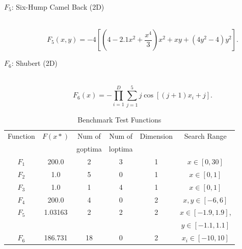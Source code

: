\documentclass[a4j,11pt]{jarticle}
\def\proposed{DNRBA}
\begin{document}
\begin{description}
\item[$F_5$: Six-Hump Camel Back (2D)]\mbox{}\\
\begin{equation}
\label{eq:F5}
F_5(x,y)=-4[(4-2.1x^2+\frac{x^4}{3})x^2+xy+(4y^2-4)y^2].
\end{equation}

\item[$F_6$: Shubert (2D)]\mbox{}\\
\begin{equation}
\label{eq:F6}
F_6(x)=-\prod_{i=1}^D \sum_{j=1}^5 j\cos[(j+1)x_i+j].
\end{equation}

\end{description}

\begin{table}[h]
\caption{Benchmark Test Functions}
\begin{center}
\begin{tabular}{c|c|c|c|c|c}
\hline

Function & $F(x*)$ & Num of & Num of & Dimension & Search Range \\
& & goptima & loptima & & \\
\hline
$F_1$ & 200.0 & 2 & 3 & 1 & $x \in [0,30]$  \\
\hline
$F_2$ & 1.0 & 5 & 0 & 1 & $x \in [0,1]$  \\
\hline
$F_3$ & 1.0 & 1 & 4 & 1 & $x \in [0,1]$  \\
\hline
$F_4$ & 200.0 & 4 & 0 & 2 & $x,y \in [-6,6]$  \\
\hline
$F_5$ & 1.03163 & 2 & 2 & 2 & $x \in [-1.9,1.9]$, \\
& & & & & $y \in [-1.1,1.1]$ \\
\hline
$F_6$ & 186.731 & 18 & 0 & 2 & $x_i \in [-10,10]$  \\
\hline
\end{tabular}
\label{tab:MOP}
\end{center}
\end{table}

\end{document}
